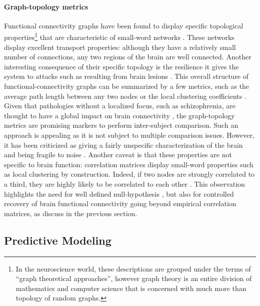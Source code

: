 \documentclass[5p]{elsarticle}
\begin{document}
\paragraph{Graph-topology metrics}
%
Functional connectivity graphs have been found to display specific
topological properties\footnote{In the neuroscience world, these
descriptions are grouped under the terms of ``graph theoretical
approaches'', however graph theory is an entire division of mathematics
and computer science that is concerned with much more than topology of
random graphs.} that are characteristic of small-word networks
\cite{stam2004,salvador2005,achard2006,bullmore2009}. These networks
display excellent transport properties: although they have a relatively
small number of connections, any two regions of the brain are well
connected. Another interesting consequence of their specific topology is
the resilience it gives the system to attacks such as resulting from
brain lesions \cite{achard2006}. This overall structure of
functional-connectivity graphs can be summarized by a few metrics, such
as the average path length between any two nodes or the local clustering
coefficients \cite{rubinov2010}. Given that pathologies without a
localized focus, such
as schizophrenia, are thought to have a global impact on brain
connectivity \cite{liu2008,bassett2008}, the graph-topology metrics are
promising markers to perform inter-subject comparison. Such an
approach is appealing as it is not subject to multiple comparison issues.
However, it has been criticized as giving a fairly unspecific
characterization of the brain and being fragile to noise
\cite{ioannides2007}. Another caveat is that these properties are not
specific to brain function: correlation matrices display
small-word properties such as local clustering by construction. Indeed, if two
nodes are strongly correlated to a third, they are highly likely to be
correlated to each other \cite{zalesky2012}. This observation highlights
the need for well defined null-hypothesis \cite{zalesky2012,rubinov2011},
but also for controlled recovery of brain functional connectivity going
beyond empirical correlation matrices, as discuss in the previous section.


\subsection{Predictive Modeling}

\end{document}
